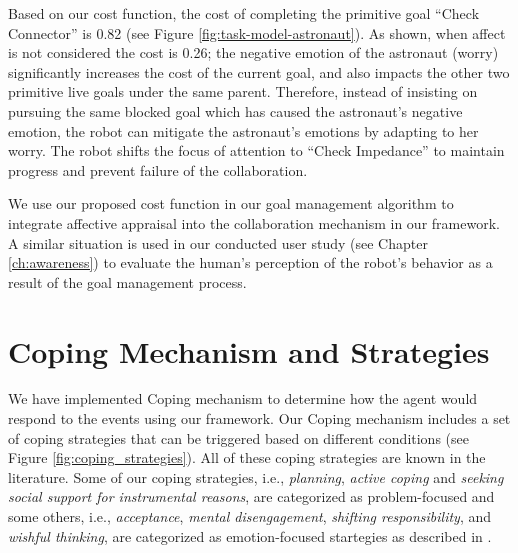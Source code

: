 \documentclass[12pt]{report}
\begin{document}
Based on our cost function, the cost of completing the primitive goal ``Check
Connector'' is 0.82 (see Figure \ref{fig:task-model-astronaut}). As shown, when
affect is not considered the cost is 0.26; the negative emotion of the astronaut
(worry) significantly increases the cost of the current goal, and also impacts
the other two primitive live goals under the same parent. Therefore, instead of
insisting on pursuing the same blocked goal which has caused the astronaut's
negative emotion, the robot can mitigate the astronaut's emotions by adapting to
her worry. The robot shifts the focus of attention to ``Check Impedance'' to
maintain progress and prevent failure of the collaboration.

We use our proposed cost function in our goal management algorithm to integrate
affective appraisal into the collaboration mechanism in our framework. A similar
situation is used in our conducted user study (see Chapter \ref{ch:awareness})
to evaluate the human's perception of the robot's behavior as a result of the
goal management process.

\section{Coping Mechanism and Strategies}
We have implemented Coping mechanism to determine how the agent would respond to
the events using our framework. Our Coping mechanism includes a set of coping
strategies that can be triggered based on different conditions (see Figure
\ref{fig:coping_strategies}). All of these coping strategies are known in the
literature. Some of our coping strategies, i.e., \textit{planning},
\textit{active coping} and \textit{seeking social support for instrumental
reasons}, are categorized as problem-focused and some others, i.e.,
\textit{acceptance}, \textit{mental disengagement}, \textit{shifting
responsibility}, and \textit{wishful thinking}, are categorized as
emotion-focused startegies as described in \cite{gratch:domain-independent}.
\end{document}
